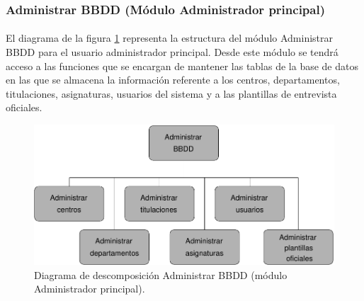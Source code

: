 \subsubsection{Administrar BBDD (Módulo Administrador principal)}

  \paragraph{}El diagrama de la figura
  \ref{diagramaDescomposicionAdministrarBBDD} representa la estructura del
  módulo Administrar BBDD para el usuario administrador principal. Desde este
  módulo se tendrá acceso a las funciones que se encargan de mantener las tablas
  de la base de datos en las que se almacena la información referente a los
  centros, departamentos, titulaciones, asignaturas, usuarios del sistema y
  a las plantillas de entrevista oficiales.

  \begin{figure}[!ht]
    \begin{center}
      \includegraphics[]{11.Disenyo_Arquitectonico/11.2.Diagramas_Descomposicion/11.2.2.Modulo_administrador_principal/AdministrarBBDD/Diagramas/administrar_bbdd.pdf}
      \caption{Diagrama de descomposición Administrar BBDD (módulo Administrador principal).}
      \label{diagramaDescomposicionAdministrarBBDD}
    \end{center}
  \end{figure}






